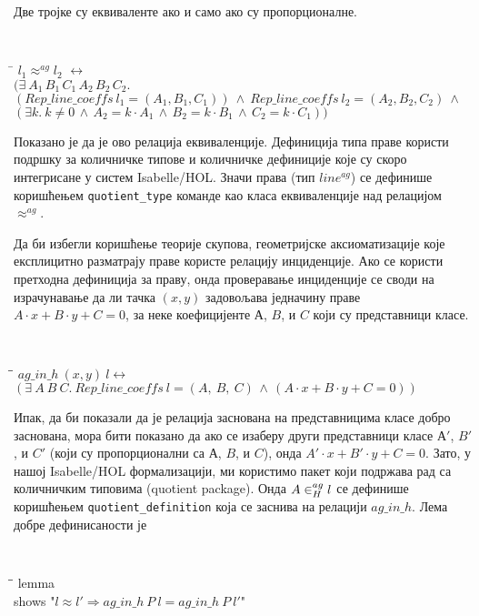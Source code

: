 Две тројке су еквиваленте ако и само ако су пропорционалне.
{\tt
\begin{tabbing}
\hspace{5mm}\=\kill
$l_1 \approx^{ag} l_2$ $\longleftrightarrow$ \\
\>  $(\exists\ A_1\,B_1\,C_1\,A_2\,B_2\,C_2.$\\
\>  $(\mathit{Rep\_line\_coeffs}\ l_1 = (A_1, B_1, C_1)) \ \wedge\ \mathit{Rep\_line\_coeffs}\ l_2 = (A_2, B_2, C_2)\ \wedge$\\
\>  $(\exists k.\ k \neq 0 \,\wedge\, A_2 = k\cdot A_1 \,\wedge\,  B_2 = k\cdot B_1\,\wedge\,C_2 = k\cdot C_1))$
\end{tabbing}
}
\noindent Показано је да је ово релација еквиваленције. Дефиниција
типа праве користи подршку за количничке типове и количничке
дефиниције које су скоро интегрисане у систем Isabelle/HOL. Значи
права (тип $\mathit{line^{ag}}$) се дефинише коришћењем
\verb|quotient_type| команде као класа еквиваленције над релацијом
$\approx^{ag}$.

Да би избегли коришћење теорије скупова, геометријске аксиоматизације
које експлицитно разматрају праве користе релацију инциденције. Ако се
користи претходна дефиниција за праву, онда проверавање инциденције се
своди на израчунавање да ли тачка $(x, y)$ задовољава једначину праве
$A\cdot x + B\cdot y + C = 0$, за неке коефицијенте $А$, $B$, и $C$
који су представници класе.
{\tt
\begin{tabbing}
\hspace{5mm}\=\hspace{5mm}\=\kill
$ag\_in\_h\ (x, y)\ l \longleftrightarrow$\\
\>$(\exists\ A\ B\ C.\ \mathit{Rep\_line\_coeffs}\ l = (A,\ B,\ C) \,\wedge\,  (A\cdot x + B\cdot y + C = 0))$
\end{tabbing}
}

Ипак, да би показали да је релација заснована на представницима класе
добро заснована, мора бити показано да ако се изаберу други
представници класе $А'$, $B'$, и $C'$ (који су пропорционални са $А$,
$B$, и $C$), онда $A'\cdot x + B'\cdot y + C = 0$. Зато, у нашој
Isabelle/HOL формализацији, ми користимо пакет који подржава рад са
количничким типовима (quotient package). Онда $A \in^{ag}_H l$ се
дефинише коришћењем \verb|quotient_definition| која се заснива на
релацији $ag\_in\_h$. Лема добре дефинисаности је
{\tt
\begin{tabbing}
\hspace{5mm}\=\hspace{5mm}\=\kill
lemma \\
\>shows "$l \approx l' \Longrightarrow ag\_in\_h\ P\ l = ag\_in\_h\ P\ l'$"
\end{tabbing}
}


